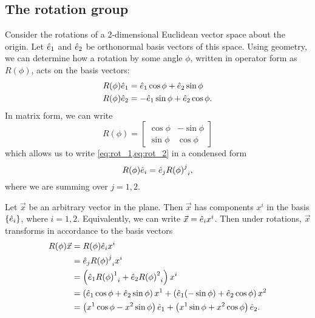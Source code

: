 \subsection{The rotation group}
Consider the rotations of a 2-dimensional Euclidean vector space about the origin. Let $\hat{e}_1$ and $\hat{e}_2$ be orthonormal basis vectors of this space. Using geometry, we can determine how a rotation by some angle $\phi$, written in operator form as $R(\phi)$, acts on the basis vectors:
    \begin{align}
        R(\phi)\hat{e}_1 &= \hat{e}_1\cos\phi + \hat{e}_2\sin\phi \label{eq:rot_1}\\
        R(\phi)\hat{e}_2 &= -\hat{e}_1\sin\phi + \hat{e}_2\cos\phi.\label{eq:rot_2}
    \end{align}
    In matrix form, we can write
    \begin{equation}
        R(\phi) = 
        \begin{bmatrix}
            \cos\phi & -\sin\phi \\
            \sin\phi & \cos\phi
        \end{bmatrix}
    \end{equation}
    which allows us to write \cref{eq:rot_1,eq:rot_2} in a condensed form
    \begin{equation}
        R(\phi)\hat{e}_i = \hat{e}_j{{R(\phi)}^j}_i,
    \end{equation}
    where we are summing over $j=1,2$.

    Let $\vec{x}$ be an arbitrary vector in the plane. Then $\vec{x}$ has components $x^i$ in the basis $\{\hat{e}_i\}$, where $i=1,2$. Equivalently, we can write $\vec{x}=\hat{e}_i x^i$. Then under rotations, $\vec{x}$ transforms in accordance to the basis vectors
    \begin{align}
        R(\phi)\vec{x} &= R(\phi)\hat{e}_i x^i \label{eq:rot_vec} \\
        &= \hat{e}_j{{R(\phi)}^j}_i x^i \nonumber \\
        &= \left( \hat{e}_1{{R(\phi)}^1}_i + \hat{e}_2{{R(\phi)}^2}_i \right)x^i \nonumber \\
        &= \left( \hat{e}_1\cos\phi + \hat{e}_2\sin\phi \right) x^1 + \left( \hat{e}_1(-\sin\phi) + \hat{e}_2\cos\phi \right) x^2 \nonumber \\
        &= \left( x^1\cos\phi - x^2\sin\phi \right)\hat{e}_1 + \left( x^1\sin\phi + x^2\cos\phi \right)\hat{e}_2.  \nonumber
    \end{align}

